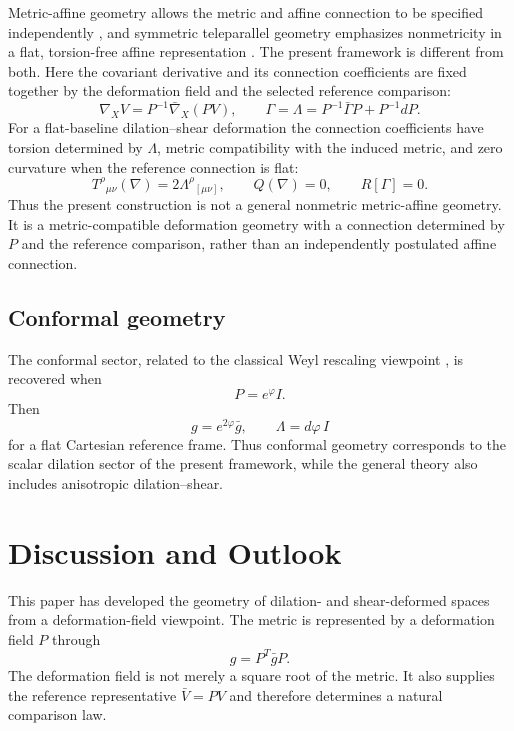 \documentclass[12pt]{amsart}
\theoremstyle{definition}
\theoremstyle{remark}
\begin{document}
Metric-affine geometry allows the metric and affine connection to be specified independently \cite{HehlEtAl}, and symmetric teleparallel geometry emphasizes nonmetricity in a flat, torsion-free affine representation \cite{NesterYo,BeltranJimenezEtAl}.  The present framework is different from both.  Here the covariant derivative and its connection coefficients are fixed together by the deformation field and the selected reference comparison:
\begin{equation}
 \nabla_XV=P^{-1}\bar\nabla_X(PV),
 \qquad
 \Gamma=\Lambda=P^{-1}\bar\Gamma P+P^{-1}dP.
\end{equation}
For a flat-baseline dilation--shear deformation the connection coefficients have torsion determined by \(\Lambda\), metric compatibility with the induced metric, and zero curvature when the reference connection is flat:
\begin{equation}
 T^\rho{}_{\mu\nu}(\nabla)=2\Lambda^\rho{}_{[\mu\nu]},
 \qquad
 Q(\nabla)=0,
 \qquad
 R[\Gamma]=0 .
\end{equation}
Thus the present construction is not a general nonmetric metric-affine geometry.  It is a metric-compatible deformation geometry with a connection determined by \(P\) and the reference comparison, rather than an independently postulated affine connection.

\subsection{Conformal geometry}

The conformal sector, related to the classical Weyl rescaling viewpoint \cite{Weyl1918}, is recovered when
\begin{equation}
 P=e^\varphi I .
\end{equation}
Then
\begin{equation}
 g=e^{2\varphi}\bar g,
 \qquad
 \Lambda=d\varphi\, I
\end{equation}
for a flat Cartesian reference frame.  Thus conformal geometry corresponds to the scalar dilation sector of the present framework, while the general theory also includes anisotropic dilation--shear.

\section{Discussion and Outlook}

This paper has developed the geometry of dilation- and shear-deformed spaces from a deformation-field viewpoint.  The metric is represented by a deformation field \(P\) through
\begin{equation}
 g=P^T\bar gP .
\end{equation}
The deformation field is not merely a square root of the metric.  It also supplies the reference representative \(\bar V=PV\) and therefore determines a natural comparison law.
\end{document}
